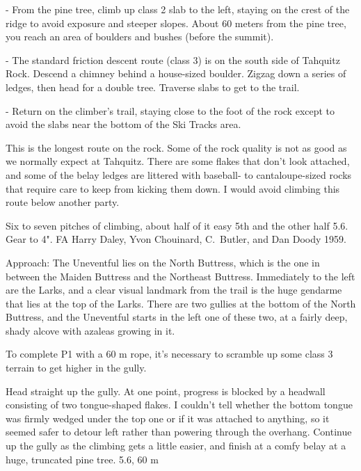 \documentclass{tahquitz}
\begin{document}
- From the pine tree, climb up class 2 slab to the left, staying on
the crest of the ridge to avoid exposure and steeper slopes. About 60
meters from the pine tree, you reach an area of boulders and bushes
(before the summit).

- The standard friction descent route (class 3) is on the south side
of Tahquitz Rock. Descend a chimney behind a house-sized boulder.
Zigzag down a series of ledges, then head for a double tree. Traverse
slabs to get to the trail.

- Return on the climber's trail, staying close to the foot of the
rock except to avoid the slabs near the bottom of the Ski Tracks area.





This is the longest route on the rock. Some of the
rock quality is not as good as we normally expect at Tahquitz. There
are some flakes that don't look attached, and some of the belay ledges
are littered with baseball- to cantaloupe-sized rocks that require care
to keep from kicking them down. I would avoid climbing this route below
another party.

Six to seven pitches of climbing, about half of it easy 5th and the
other half 5.6. Gear to 4".
FA Harry Daley, Yvon Chouinard, C.~Butler, and Dan Doody 1959.

Approach: The Uneventful lies on the North Buttress, which is the one
in between the Maiden Buttress and the Northeast Buttress. Immediately
to the left are the Larks, and a clear visual landmark from the trail
is the huge gendarme that lies at the top of the Larks. There are two
gullies at the bottom of the North Buttress, and the Uneventful starts in the
left one of these two, at a fairly deep, shady alcove with azaleas
growing in it.

To complete P1 with a 60 m rope, it's necessary to scramble up some
class 3 terrain to get higher in the gully.

 Head straight up the gully. At one point, progress is blocked
by a headwall consisting of two tongue-shaped flakes.
I couldn't tell whether the bottom tongue was firmly wedged under the top
one or if it was attached to anything, so it seemed safer to detour left
rather than powering through the overhang. Continue up the gully as the
climbing gets a little easier, and finish at a comfy belay at a huge,
truncated pine tree. 5.6, 60 m
\end{document}
